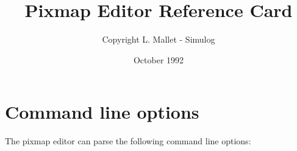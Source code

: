 \newcommand{\PAGESIZE}[2]
        {
                \textheight #1
                \textwidth #2
        }
 \newcommand{\MARGINS}[3]
        {
                \topmargin #1
                \oddsidemargin #2
                \evensidemargin #3
        }
\PAGESIZE{21.5cm}{16cm}
\MARGINS{-10mm}{0mm}{0mm}
\footskip 20mm

\title{Pixmap Editor Reference Card}
\author{Copyright L. Mallet - Simulog}
\date{October 1992}
 
\maketitle
\section{Command line options}

The pixmap editor can parse the following command line options:\\


